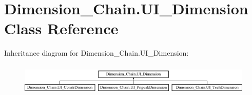 \hypertarget{class_dimension___chain_1_1_u_i___dimension}{}\section{Dimension\+\_\+\+Chain.\+U\+I\+\_\+\+Dimension Class Reference}
\label{class_dimension___chain_1_1_u_i___dimension}
Inheritance diagram for Dimension\+\_\+\+Chain.\+U\+I\+\_\+\+Dimension\+:\begin{figure}[H]
\begin{center}
\leavevmode
\includegraphics[height=1.555556cm]{class_dimension___chain_1_1_u_i___dimension}
\end{center}
\end{figure}

